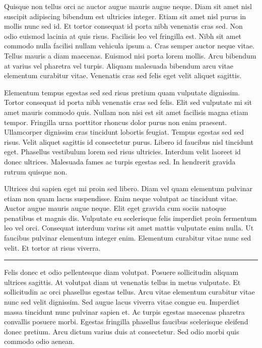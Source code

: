 \documentclass[10pt]{article} %
\newenvironment{BoxedInternal}[1][]
{%
  \begin{changemargin}{0cm}{0cm}%
    \begin{mdframed}[roundcorner=5pt,backgroundcolor=swred,outermargin  =-0.5in,innermargin =-0.5in, topline=false, bottomline=false, rightline=false, leftline=false,#1]
    }{%
    \end{mdframed}%
  \end{changemargin}%
}
\newcommand*{\noind}{\setlength{\parindent}{0cm}} %
\newcommand{\bighdr}[2][]{%
\vspace{2pt}
  \begin{BoxedInternal}[#1]{}
    \color{white}\huge\bfseries\headingfont\filcenter{#2}
  \end{BoxedInternal}\vspace{-8pt}%
}
\newcommand{\medhdr}[1][]{%
	{\noind{\Large\bfseries\headingfont{#1}}}
	\vspace{-9pt}

	\noindent\rule{2.75in}{2pt} %
}
\newcommand{\smlhdr}[1][]{%
	{\noind{\large\bfseries\headingfont{#1}}}
}
\begin{document}
\begin{multicols}{2}
\smlhdr[SMALLER SECTION] %

{\noind
Quisque non tellus orci ac auctor augue mauris augue neque. Diam sit amet nisl suscipit adipiscing bibendum est ultricies integer. Etiam sit amet nisl purus in mollis nunc sed id. Et tortor consequat id porta nibh venenatis cras sed. Non odio euismod lacinia at quis risus. Facilisis leo vel fringilla est. Nibh sit amet commodo nulla facilisi nullam vehicula ipsum a. Cras semper auctor neque vitae. Tellus mauris a diam maecenas. Euismod nisi porta lorem mollis. Arcu bibendum at varius vel pharetra vel turpis. Aliquam malesuada bibendum arcu vitae elementum curabitur vitae. Venenatis cras sed felis eget velit aliquet sagittis.
}

\bighdr{COOL STUFF}
{\noind
Elementum tempus egestas sed sed risus pretium quam vulputate dignissim. Tortor consequat id porta nibh venenatis cras sed felis. Elit sed vulputate mi sit amet mauris commodo quis. Nullam non nisi est sit amet facilisis magna etiam tempor. Fringilla urna porttitor rhoncus dolor purus non enim praesent. Ullamcorper dignissim cras tincidunt lobortis feugiat. Tempus egestas sed sed risus. Velit aliquet sagittis id consectetur purus. Libero id faucibus nisl tincidunt eget. Phasellus vestibulum lorem sed risus ultricies. Interdum velit laoreet id donec ultrices. Malesuada fames ac turpis egestas sed. In hendrerit gravida rutrum quisque non.
}

Ultrices dui sapien eget mi proin sed libero. Diam vel quam elementum pulvinar etiam non quam lacus suspendisse. Enim neque volutpat ac tincidunt vitae. Auctor augue mauris augue neque. Elit eget gravida cum sociis natoque penatibus et magnis dis. Vulputate eu scelerisque felis imperdiet proin fermentum leo vel orci. Consequat interdum varius sit amet mattis vulputate enim nulla. Ut faucibus pulvinar elementum integer enim. Elementum curabitur vitae nunc sed velit. Et tortor at risus viverra.\\

\medhdr[ANOTHER SMALL SECTION]
{\noind
Felis donec et odio pellentesque diam volutpat. Posuere sollicitudin aliquam ultrices sagittis. At volutpat diam ut venenatis tellus in metus vulputate. Et sollicitudin ac orci phasellus egestas tellus. Arcu vitae elementum curabitur vitae nunc sed velit dignissim. Sed augue lacus viverra vitae congue eu. Imperdiet massa tincidunt nunc pulvinar sapien et. Ac turpis egestas maecenas pharetra convallis posuere morbi. Egestas fringilla phasellus faucibus scelerisque eleifend donec pretium. Arcu dictum varius duis at consectetur. Sed odio morbi quis commodo odio aenean.
}


\end{multicols}
\end{document}
